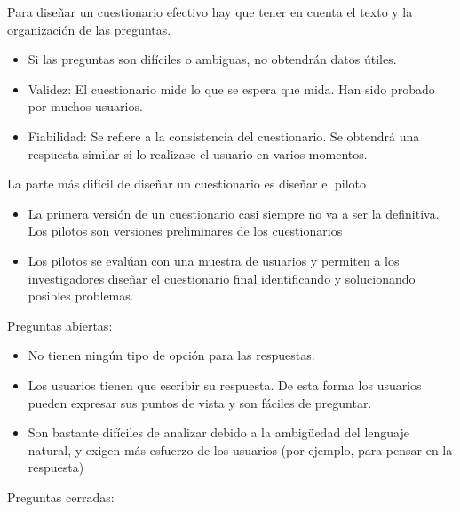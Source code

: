 \documentclass[12pt, twoside, openright]{report} %
\begin{document}
Para diseñar un cuestionario efectivo hay que tener en cuenta el
texto y la organización de las preguntas.

\begin{itemize}
	\item Si las preguntas son difíciles o ambiguas, no obtendrán datos
	      útiles.
	\item Validez: El cuestionario mide lo que se espera que mida. Han
	      sido probado por muchos usuarios.
	\item Fiabilidad: Se refiere a la consistencia del cuestionario. Se
	      obtendrá una respuesta similar si lo realizase el usuario en
	      varios momentos.
\end{itemize}

La parte más difícil de diseñar un cuestionario es diseñar el
piloto

\begin{itemize}
	\item La primera versión de un cuestionario casi siempre no va a ser
	      la definitiva. Los pilotos son versiones preliminares de los
	      cuestionarios
	\item Los pilotos se evalúan con una muestra de usuarios y permiten
	      a los investigadores diseñar el cuestionario final
	      identificando y solucionando posibles problemas.
\end{itemize}

Preguntas abiertas:

\begin{itemize}
	\item No tienen ningún tipo de opción para las respuestas.
	\item Los usuarios tienen que escribir su respuesta. De esta forma
	      los usuarios pueden expresar sus puntos de vista y son fáciles
	      de preguntar.
	\item Son bastante difíciles de analizar debido a la ambigüedad del
	      lenguaje natural, y exigen más esfuerzo de los usuarios (por
	      ejemplo, para pensar en la respuesta)
\end{itemize}

Preguntas cerradas:
\end{document}
